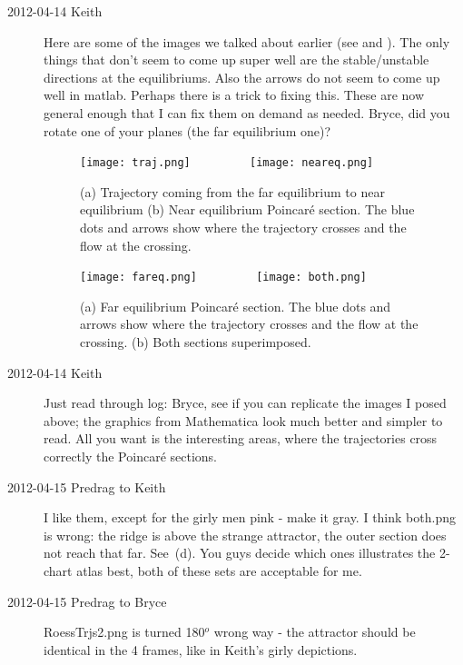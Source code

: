 \begin{description}
\item[2012-04-14 Keith] Here are some of the images we talked about earlier (see  and ).  The only things that don't seem to come up super well are the stable/unstable directions at the equilibriums.  Also the arrows do not seem to come up well in matlab.  Perhaps there is a trick to fixing this.  These are now general enough that I can fix them on demand as needed.  Bryce, did you rotate one of your planes (the far equilibrium one)?
    \begin{figure}
    \begin{center}
    \texttt{[image: traj.png]}%
~~~~~~~~
    \texttt{[image: neareq.png]}%
    \end{center}
    \caption{
    (a)
    Trajectory coming from the far equilibrium to near equilibrium
    (b)
    Near equilibrium Poincar\'e section.  The blue dots and arrows show
    where the trajectory crosses and the flow at the crossing.
        }{\label{fig:2poin}}
 \end{figure}

 \begin{figure}[H]
 \begin{center}
\texttt{[image: fareq.png]}%
~~~~~~~~
\texttt{[image: both.png]}%
 \end{center}
 \caption{
(a)
Far equilibrium Poincar\'e section. The blue dots and arrows show where
the trajectory crosses and the flow at the crossing.
(b)
Both sections superimposed.
    }{\label{fig:bothpoin}}
 \end{figure}

\item[2012-04-14 Keith] Just read through log: Bryce, see if you can
replicate the images I posed above; the graphics from Mathematica look
much better and simpler to read.  All you want is the interesting areas,
where the trajectories cross correctly the Poincar\'e sections.

\item[2012-04-15 Predrag to Keith] I like them, except for the girly men
pink - make it gray. I think both.png is wrong: the ridge is above the
strange attractor, the outer section does not reach that far. See
\,(d). You guys decide which ones illustrates the
2-chart atlas  best, both of these sets are acceptable for me.


\item[2012-04-15 Predrag to Bryce] RoessTrjs2.png is turned 180$^o$ wrong
way - the attractor should be identical in the 4 frames, like in Keith's
girly depictions.


\end{description}
